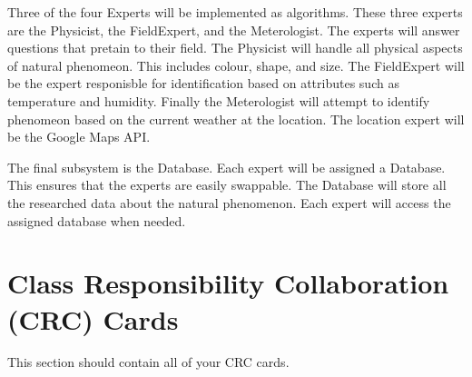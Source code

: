\documentclass[]{article}
\begin{document}
Three of the four Experts will be implemented as algorithms. These three experts are the Physicist, the FieldExpert, and the Meterologist. The experts will answer questions that pretain to their field. The Physicist will handle all physical aspects of natural phenomeon. This includes colour, shape, and size. The FieldExpert will be the expert responisble for identification based on attributes such as temperature and humidity. Finally the Meterologist will attempt to identify phenomeon based on the current weather at the location. The location expert will be the Google Maps API.

The final subsystem is the Database. Each expert will be assigned a Database. This ensures that the experts are easily swappable. The Database will store all the researched data about the natural phenomenon. Each expert will access the assigned database when needed. 

	
\section{Class Responsibility Collaboration (CRC) Cards}
\label{sec:class_responsibility_collaboration_crc_cards}
This section should contain all of your CRC cards.
\end{document}
